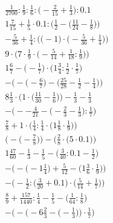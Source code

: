 \documentclass[8pt]{article}
\begin{document}
\begin{align}
\frac{1}{2700} : \frac{1}{9} : \frac{1}{6} : \big(-\frac{2}{15} + \frac{1}{3}\big) : 0.1 \\
1\frac{7}{15} + \frac{1}{5} \cdot 0.1 : \Big(\frac{1}{2} - \big(\frac{11}{24} - \frac{1}{8}\big)\Big) \\
-\frac{5}{36} + \frac{1}{4} : \Big(\big(-1\big) \cdot \big(-\frac{5}{36} + \frac{1}{4}\big)\Big) \\
9 \cdot \Big(7 \cdot \frac{1}{9} \cdot \big(-\frac{5}{14} + \frac{1}{18} : \frac{1}{9}\big)\Big) \\
1\frac{6}{7} - \big(-\frac{1}{7}\big) \cdot \big(1\frac{3}{4} : \frac{1}{2} \cdot \frac{1}{7}\big) \\
-\Big(-\big(-\frac{6}{7}\big) - \big(\frac{25}{28} - \frac{1}{2} - \frac{1}{4}\big)\Big) \\
8\frac{1}{3} \cdot \Big(1 \cdot \big(\frac{11}{30} - \frac{1}{6}\big)\Big) - \frac{1}{3} - \frac{1}{3} \\
-\Big(--\frac{4}{21} - \big(-\frac{2}{3} - \frac{1}{3}\big) : \frac{1}{7}\Big) \\
\frac{7}{8} + 1 \cdot \Big(\frac{1}{4} : \frac{1}{4} \cdot \big(1\frac{1}{8} \cdot \frac{1}{9}\big)\Big) \\
\Big(-\big(-\frac{7}{8}\big)\Big) - \Big(\frac{2}{8} \cdot \big(5 \cdot 0.1\big)\Big) \\
1\frac{47}{60} - \frac{1}{3} - \frac{1}{5} - \big(\frac{3}{40} : 0.1 - \frac{1}{2}\big) \\
-\Big(-\big(-1\frac{1}{4}\big) + \frac{5}{12} - \big(1\frac{3}{6} \cdot \frac{1}{9}\big)\Big) \\
-\Big(-\frac{1}{2} : \big(\frac{3}{20} + 0.1\big) \cdot \big(\frac{5}{14} + \frac{1}{7}\big)\Big) \\
\frac{8}{9} + \frac{157}{1440} : \frac{1}{4} - \frac{1}{5} - \big(\frac{1}{64} : \frac{1}{8}\big) \\
-\bigg(-\Big(-6\frac{2}{3} - \big(-\frac{1}{3}\big)\Big) \cdot \frac{1}{7}\bigg)
\end{align}
\end{document}
